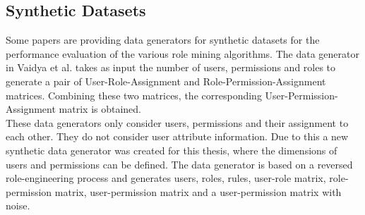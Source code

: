 \subsection{Synthetic Datasets}
Some papers are providing data generators for synthetic datasets for the performance evaluation of the various role mining algorithms. The data generator in Vaidya et al.\cite{Vaidya:2006:RMR:1180405.1180424} takes as input the number of users, permissions and roles to generate a pair of User-Role-Assignment and Role-Permission-Assignment matrices. Combining these two matrices, the corresponding User-Permission-Assignment matrix is obtained.\\

These data generators only consider users, permissions and their assignment to each other. They do not consider user attribute information. Due to this a new synthetic data generator was created for this thesis, where the dimensions of users and permissions can be defined. The data generator is based on a reversed role-engineering process and generates users, roles, rules, user-role matrix, role-permission matrix, user-permission matrix and a user-permission matrix with noise.

